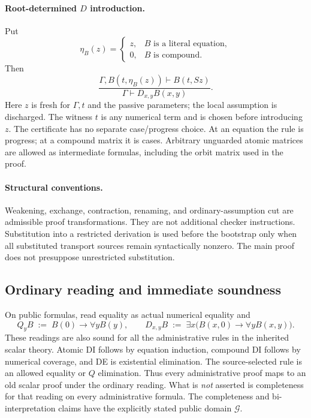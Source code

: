 \documentclass[11pt,letterpaper]{article}
\theoremstyle{definition}\newtheorem{definition}[theorem]{Definition}
\theoremstyle{remark}\newtheorem{remark}[theorem]{Remark}
\newcommand{\CG}{\mathcal G}
\begin{document}
\paragraph{Root-determined $D$ introduction.}
Put
\[
 \eta_B(z)=
 \begin{cases}z,&B\text{ is a literal equation},\\
               0,&B\text{ is compound}.
 \end{cases}
\]
Then
\[
 \frac{\Gamma,B(t,\eta_B(z))\vdash B(t,Sz)}
      {\Gamma\vdash D_{x,y}B(x,y)}.                 \tag{DI}
\]
Here $z$ is fresh for $\Gamma,t$ and the passive parameters; the local
assumption is discharged. The witness $t$ is any numerical term and is
chosen before introducing $z$. The certificate has no separate
case/progress choice. At an equation the rule is progress; at a compound
matrix it is cases. Arbitrary unguarded atomic matrices are allowed as
intermediate formulas, including the orbit matrix used in the proof.

\paragraph{Structural conventions.}
Weakening, exchange, contraction, renaming, and ordinary-assumption cut are
admissible proof transformations. They are not additional checker
instructions. Substitution into a restricted derivation is used before the
bootstrap only when all substituted transport sources remain syntactically
nonzero. The main proof does not presuppose unrestricted substitution.

\subsection{Ordinary reading and immediate soundness}

On public formulas, read equality as actual numerical equality and
\[
 Q_yB\;:=\;B(0)\to\forall yB(y),\qquad
 D_{x,y}B\;:=\;\exists x\bigl(B(x,0)\to\forall yB(x,y)\bigr).
                                                               \tag{R}
\]
These readings are also sound for all the administrative rules in the
inherited scalar theory. Atomic DI follows by equation induction, compound
DI follows by numerical coverage, and DE is existential elimination. The
source-selected rule is an allowed equality or $Q$ elimination. Thus every
administrative proof maps to an old scalar proof under the ordinary reading.
What is \emph{not} asserted is completeness for that reading on every
administrative formula. The completeness and bi-interpretation claims have
the explicitly stated public domain $\CG$.
\end{document}

